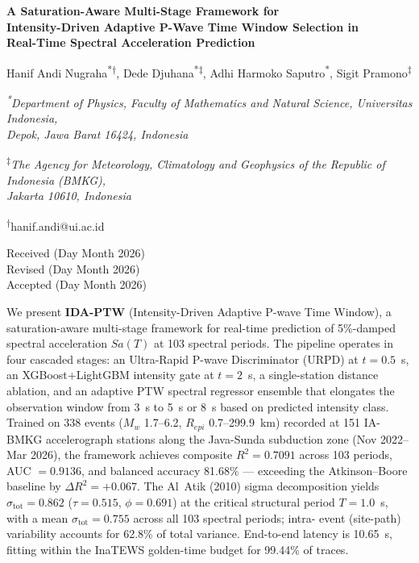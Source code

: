 \documentclass[10pt]{article}
\newcommand{\jetTitle}[1]{%
  \begin{center}\bfseries\fontsize{10}{12}\selectfont #1\end{center}\vspace{1em}}
\newcommand{\jetAuthors}[1]{%
  \begin{center}\fontsize{8}{10}\selectfont #1\end{center}}
\newcommand{\jetAffil}[1]{%
  \begin{center}\fontsize{8}{10}\selectfont\itshape #1\end{center}}
\newcommand{\jetEmail}[1]{%
  \begin{center}\fontsize{8}{10}\selectfont #1\end{center}}
\newcommand{\jetReceived}[3]{%
  \begin{center}\fontsize{9}{11}\selectfont
   Received #1\\Revised #2\\Accepted #3
  \end{center}\vspace{0.5em}}
\renewenvironment{abstract}{%
  \par\addvspace{0.5em}%
  \list{}{\leftmargin=0.25in \rightmargin=0.25in
          \topsep=0pt \parsep=0pt}\item[]%
  \fontsize{8}{10}\selectfont
}{%
  \endlist\par\addvspace{0.3em}%
}
\newcommand{\jetfnasterisk}{\textsuperscript{*}}
\newcommand{\jetfndagger}{\textsuperscript{$\dagger$}}
\newcommand{\jetfndaggerd}{\textsuperscript{$\ddagger$}}
\begin{document}
\thispagestyle{firstpage}

\jetTitle{A Saturation-Aware Multi-Stage Framework for\\
Intensity-Driven Adaptive P-Wave Time Window Selection in\\
Real-Time Spectral Acceleration Prediction}

\jetAuthors{Hanif Andi Nugraha\jetfnasterisk\jetfndagger,
Dede Djuhana\jetfnasterisk\jetfndaggerd,
Adhi Harmoko Saputro\jetfnasterisk,
Sigit Pramono\jetfndaggerd}

\jetAffil{\textsuperscript{*}Department of Physics, Faculty of Mathematics
and Natural Science, Universitas Indonesia,\\
Depok, Jawa Barat 16424, Indonesia}

\jetAffil{\textsuperscript{$\ddagger$}The Agency for Meteorology, Climatology
and Geophysics of the Republic of Indonesia (BMKG),\\
Jakarta 10610, Indonesia}

\jetEmail{\textsuperscript{$\dagger$}hanif.andi@ui.ac.id}

\jetReceived{(Day Month 2026)}{(Day Month 2026)}{(Day Month 2026)}

\begin{abstract}
We present \textbf{IDA-PTW} (Intensity-Driven Adaptive P-wave Time Window),
a saturation-aware multi-stage framework for real-time prediction of 5\%-damped
spectral acceleration $Sa(T)$ at 103 spectral periods. The pipeline operates
in four cascaded stages: an Ultra-Rapid P-wave Discriminator (URPD) at
$t = 0.5$~s, an XGBoost+LightGBM intensity gate at $t = 2$~s, a single-station
distance ablation, and an adaptive PTW spectral regressor ensemble that
elongates the observation window from 3~s to 5~s or 8~s based on predicted
intensity class. Trained on 338 events ($M_w$ 1.7--6.2, $R_{epi}$ 0.7--299.9~km)
recorded at 151 IA-BMKG accelerograph stations along the Java-Sunda subduction
zone (Nov 2022--Mar 2026), the framework achieves composite $R^2 = 0.7091$ across 103
periods, AUC $= 0.9136$, and balanced accuracy 81.68\% --- exceeding the
Atkinson--Boore baseline by $\Delta R^2 = +0.067$. The Al~Atik (2010) sigma
decomposition yields $\sigma_{\mathrm{tot}} = 0.862$ ($\tau = 0.515$, $\phi = 0.691$) at the
critical structural period $T = 1.0$~s, with a mean $\sigma_{\mathrm{tot}} = 0.755$ across all 103 spectral periods; intra-
event (site-path) variability accounts for 62.8\% of total variance. End-to-end latency is 10.65~s, fitting within the InaTEWS
golden-time budget for 99.44\% of traces.
\end{abstract}
\end{document}
